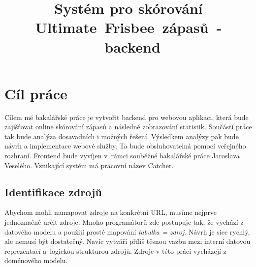 \documentclass[thesis=B,czech]{FITthesis}[2012/06/26]
\title{Systém pro skórování Ultimate~Frisbee~zápasů~-~backend}
\begin{document}
 
 
 
 \begin{introduction}
 \end{introduction}
 
 \chapter{Cíl práce}
 
 Cílem mé bakalářské práce je vytvořit backend pro webovou aplikaci, která bude zajišťovat online
 skórování zápasů a následné zobrazování statistik. Sou\-částí práce tak bude analýza dosavadních
 i možných řešení. Výsledkem analýzy pak bude návrh a implementace webové služby. Ta bude obsluhovatelná
 pomocí veřejného rozhraní. Frontend bude vyvíjen v~rámci souběžné bakalářské práce Jaroslava Veselého.
 Vznikající systém má pracovní název Catcher.

 

 

 




\section{Identifikace zdrojů}


\indent

Abychom mohli namapovat zdroje na konkrétní URL, musíme nejprve jednoznačně určit zdroje.
Mnoho programátorů zde postupuje tak, že vychází z datového modelu a použijí prosté mapování \textit{tabulka = zdroj}.
Návrh je sice rychlý, ale nemusí být dostatečný. Navíc vytváří příliš těsnou vazbu mezi interní datovou reprezentací
a~logickou strukturou zdrojů. Zdroje v této práci vycházejí z doménového modelu.
\end{document}
